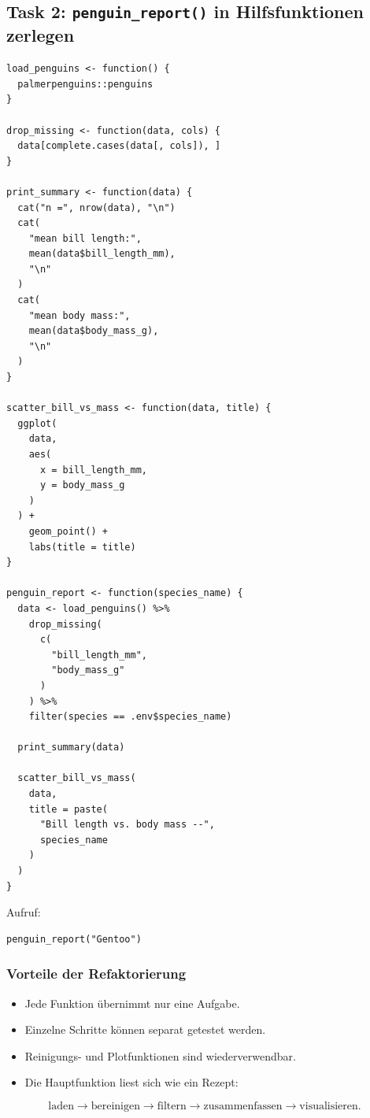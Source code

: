 \documentclass[11pt,a4paper]{ctexart}
\begin{document}
\subsection{Task 2: \texttt{penguin\_report()} in Hilfsfunktionen zerlegen}

\begin{lstlisting}
load_penguins <- function() {
  palmerpenguins::penguins
}

drop_missing <- function(data, cols) {
  data[complete.cases(data[, cols]), ]
}

print_summary <- function(data) {
  cat("n =", nrow(data), "\n")
  cat(
    "mean bill length:",
    mean(data$bill_length_mm),
    "\n"
  )
  cat(
    "mean body mass:",
    mean(data$body_mass_g),
    "\n"
  )
}

scatter_bill_vs_mass <- function(data, title) {
  ggplot(
    data,
    aes(
      x = bill_length_mm,
      y = body_mass_g
    )
  ) +
    geom_point() +
    labs(title = title)
}

penguin_report <- function(species_name) {
  data <- load_penguins() %>%
    drop_missing(
      c(
        "bill_length_mm",
        "body_mass_g"
      )
    ) %>%
    filter(species == .env$species_name)

  print_summary(data)

  scatter_bill_vs_mass(
    data,
    title = paste(
      "Bill length vs. body mass --",
      species_name
    )
  )
}
\end{lstlisting}

Aufruf:

\begin{lstlisting}
penguin_report("Gentoo")
\end{lstlisting}

\subsubsection*{Vorteile der Refaktorierung}

\begin{itemize}
  \item Jede Funktion übernimmt nur eine Aufgabe.
  \item Einzelne Schritte können separat getestet werden.
  \item Reinigungs- und Plotfunktionen sind wiederverwendbar.
  \item Die Hauptfunktion liest sich wie ein Rezept:
\end{itemize}

\[
\text{laden}
\rightarrow
\text{bereinigen}
\rightarrow
\text{filtern}
\rightarrow
\text{zusammenfassen}
\rightarrow
\text{visualisieren}.
\]
\end{document}
